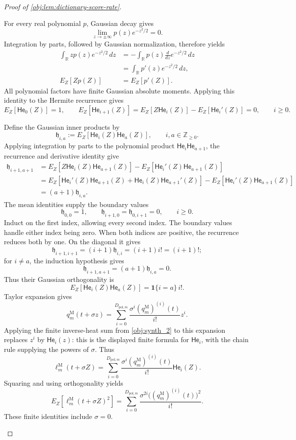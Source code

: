 \documentclass[11pt]{article}
\begin{document}
\begin{proof}[Proof of \cref{obj:lem:dictionary-score-rate}]
\begin{enumerate}
For every real polynomial \(p\), Gaussian decay gives
\[
\lim_{z\to\pm\infty}p(z)e^{-z^2/2}=0.
\]
Integration by parts, followed by Gaussian normalization, therefore yields
\[
\begin{aligned}
\int_{\mathbb R}zp(z)e^{-z^2/2}\,dz
&=-\int_{\mathbb R}p(z)\frac{d}{dz}e^{-z^2/2}\,dz\\
&=\int_{\mathbb R}p'(z)e^{-z^2/2}\,dz,\\
E_Z[Zp(Z)]&=E_Z[p'(Z)].
\end{aligned}
\]
All polynomial factors have finite Gaussian absolute moments. Applying this identity to the Hermite recurrence gives
\[
E_Z[\mathsf{He}_0(Z)]=1,\qquad
E_Z[\mathsf{He}_{i+1}(Z)]
=E_Z[Z\mathsf{He}_i(Z)]-E_Z[\mathsf{He}_i'(Z)]=0,
\qquad i\ge0.
\]

Define the Gaussian inner products by
\[
\mathfrak h_{i,a}:=E_Z[\mathsf{He}_i(Z)\mathsf{He}_a(Z)],
\qquad i,a\in\mathbb Z_{\ge0}.
\]
Applying integration by parts to the polynomial product
\(\mathsf{He}_i\mathsf{He}_{a+1}\), the recurrence and derivative identity give
\[
\begin{aligned}
\mathfrak h_{i+1,a+1}
&=E_Z[Z\mathsf{He}_i(Z)\mathsf{He}_{a+1}(Z)]
  -E_Z[\mathsf{He}_i'(Z)\mathsf{He}_{a+1}(Z)]\\
&=E_Z[\mathsf{He}_i'(Z)\mathsf{He}_{a+1}(Z)
       +\mathsf{He}_i(Z)\mathsf{He}_{a+1}'(Z)]
  -E_Z[\mathsf{He}_i'(Z)\mathsf{He}_{a+1}(Z)]\\
&=(a+1)\mathfrak h_{i,a}.
\end{aligned}
\]
The mean identities supply the boundary values
\[
\mathfrak h_{0,0}=1,\qquad
\mathfrak h_{i+1,0}=\mathfrak h_{0,i+1}=0,
\qquad i\ge0.
\]
Induct on the first index, allowing every second index. The boundary values handle either index being zero. When both indices are positive, the recurrence reduces both by one. On the diagonal it gives
\[
\mathfrak h_{i+1,i+1}=(i+1)\mathfrak h_{i,i}
=(i+1)i!=(i+1)!;
\]
for \(i\ne a\), the induction hypothesis gives
\[
\mathfrak h_{i+1,a+1}=(a+1)\mathfrak h_{i,a}=0.
\]
Thus their Gaussian orthogonality is
\[
E_Z[\mathsf{He}_i(Z)\mathsf{He}_a(Z)]
=\mathbf1\{i=a\}\,i!.
\]
Taylor expansion gives
\[
q_m^{\mathrm M}(t+\sigma z)
=\sum_{i=0}^{D_{\mathrm{pol},m}}
\frac{\sigma^i(q_m^{\mathrm M})^{(i)}(t)}{i!}z^i.
\]
Applying the finite inverse-heat sum from \cref{obj:synth_2} to this expansion replaces \(z^i\) by \(\mathsf{He}_i(z)\): this is the displayed finite formula for \(\mathsf{He}_i\), with the chain rule supplying the powers of \(\sigma\). Thus
\[
\ell_m^{\mathrm M}(t+\sigma Z)
=\sum_{i=0}^{D_{\mathrm{pol},m}}
\frac{\sigma^i(q_m^{\mathrm M})^{(i)}(t)}{i!}\mathsf{He}_i(Z).
\]
Squaring and using orthogonality yields
\[
E_Z[\ell_m^{\mathrm M}(t+\sigma Z)^2]
=\sum_{i=0}^{D_{\mathrm{pol},m}}
\frac{\sigma^{2i}\bigl((q_m^{\mathrm M})^{(i)}(t)\bigr)^2}{i!}.
\]
These finite identities include \(\sigma=0\).


\end{enumerate}
\end{proof}
\end{document}
